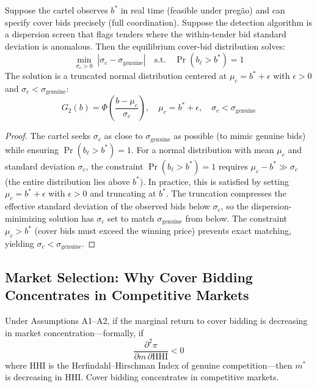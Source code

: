 \begin{proposition}
\label{prop:regime2}
Suppose the cartel observes $b^*$ in real time (feasible under
preg\~ao) and can specify cover bids precisely (full coordination).
Suppose the detection algorithm is a dispersion screen that flags
tenders where the within-tender bid standard deviation is anomalous.
Then the equilibrium cover-bid distribution solves:
\begin{equation}
  \min_{\sigma_c > 0} \; \left| \sigma_c - \sigma_{\text{genuine}}
  \right| \quad \text{s.t.} \quad \Pr(b_\ell > b^*) = 1
  \label{eq:regime2_opt}
\end{equation}
The solution is a truncated normal distribution centered at
$\mu_c = b^* + \epsilon$ with $\epsilon > 0$ and
$\sigma_c < \sigma_{\text{genuine}}$:
\begin{equation}
  G_2(b) = \Phi\!\left(\frac{b - \mu_c}{\sigma_c}\right),
  \quad \mu_c = b^* + \epsilon, \quad
  \sigma_c < \sigma_{\text{genuine}}
  \label{eq:regime2}
\end{equation}
\end{proposition}

\begin{proof}
The cartel seeks $\sigma_c$ as close to $\sigma_{\text{genuine}}$ as
possible (to mimic genuine bids) while ensuring $\Pr(b_\ell > b^*) = 1$.
For a normal distribution with mean $\mu_c$ and standard deviation
$\sigma_c$, the constraint $\Pr(b_\ell > b^*) = 1$ requires
$\mu_c - b^* \gg \sigma_c$ (the entire distribution lies above $b^*$).
In practice, this is satisfied by setting $\mu_c = b^* + \epsilon$
with $\epsilon > 0$ and truncating at $b^*$. The truncation compresses
the effective standard deviation of the observed bids below $\sigma_c$,
so the dispersion-minimizing solution has $\sigma_c$ set to match
$\sigma_{\text{genuine}}$ from below. The constraint $\mu_c > b^*$
(cover bids must exceed the winning price) prevents exact matching,
yielding $\sigma_c < \sigma_{\text{genuine}}$.
\end{proof}


\subsection{Market Selection: Why Cover Bidding Concentrates in
Competitive Markets}
\label{sec:market_selection}

\begin{proposition}
\label{prop:market_selection}
Under Assumptions A1--A2, if the marginal return to cover bidding is
decreasing in market concentration---formally, if
\begin{equation}
  \frac{\partial^2 \pi}{\partial m \, \partial \text{HHI}} < 0
  \label{eq:cross_deriv}
\end{equation}
where $\text{HHI}$ is the Herfindahl--Hirschman Index of genuine
competition---then $m^*$ is decreasing in HHI. Cover bidding
concentrates in competitive markets.
\end{proposition}

